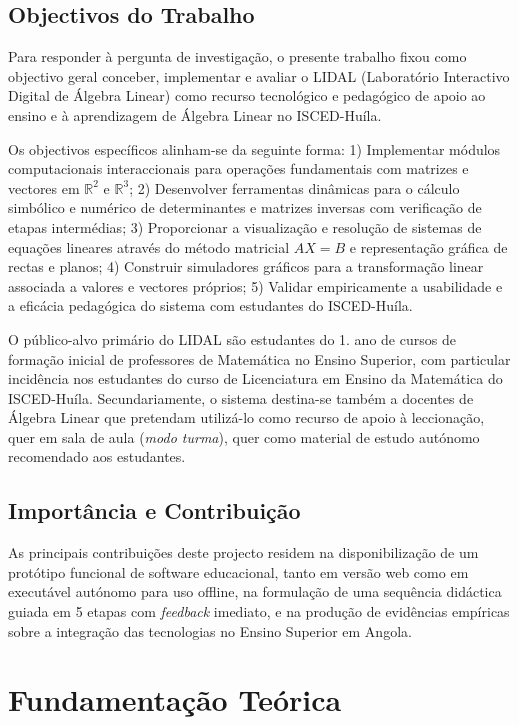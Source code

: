 \documentclass[conference]{IEEEtran}
\begin{document}
\subsection{Objectivos do Trabalho}

Para responder à pergunta de investigação, o presente trabalho fixou como objectivo geral conceber, implementar e avaliar o LIDAL (Laboratório Interactivo Digital de Álgebra Linear) como recurso tecnológico e pedagógico de apoio ao ensino e à aprendizagem de Álgebra Linear no ISCED-Huíla.

Os objectivos específicos alinham-se da seguinte forma: 1) Implementar módulos computacionais interaccionais para operações fundamentais com matrizes e vectores em $\mathbb{R}^2$ e $\mathbb{R}^3$; 2) Desenvolver ferramentas dinâmicas para o cálculo simbólico e numérico de determinantes e matrizes inversas com verificação de etapas intermédias; 3) Proporcionar a visualização e resolução de sistemas de equações lineares através do método matricial $AX = B$ e representação gráfica de rectas e planos; 4) Construir simuladores gráficos para a transformação linear associada a valores e vectores próprios; 5) Validar empiricamente a usabilidade e a eficácia pedagógica do sistema com estudantes do ISCED-Huíla.

O público-alvo primário do LIDAL são estudantes do 1.\textordmasculine{} ano de cursos de formação inicial de professores de Matemática no Ensino Superior, com particular incidência nos estudantes do curso de Licenciatura em Ensino da Matemática do ISCED-Huíla. Secundariamente, o sistema destina-se também a docentes de Álgebra Linear que pretendam utilizá-lo como recurso de apoio à leccionação, quer em sala de aula (\textit{modo turma}), quer como material de estudo autónomo recomendado aos estudantes.

\subsection{Importância e Contribuição}

As principais contribuições deste projecto residem na disponibilização de um protótipo funcional de software educacional, tanto em versão web como em executável autónomo para uso offline, na formulação de uma sequência didáctica guiada em 5 etapas com \textit{feedback} imediato, e na produção de evidências empíricas sobre a integração das tecnologias no Ensino Superior em Angola.

\section{Fundamentação Teórica}
\end{document}
